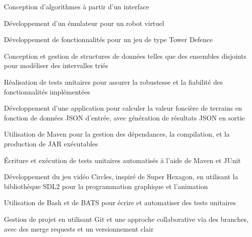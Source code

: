 \documentclass[letterpaper,10pt]{article}
\begin{document}
  \begin{resume_list}
    \item Conception d’algorithmes à partir d’un interface
    \vspace{2pt}
    \item Développement d’un émulateur pour un robot virtuel
    \vspace{2pt}
    \item Développement de fonctionnalités pour un jeu de type Tower Defence
    \vspace{2pt}
    \item Conception et gestion de structures de données telles que des ensembles disjoints pour modéliser des intervalles triés
    \vspace{2pt}
    \item Réalisation de tests unitaires pour assurer la robustesse et la fiabilité des fonctionnalités implémentées
    
  \end{resume_list}

  \begin{resume_list}
    \item Développement d’une application pour calculer la valeur foncière de terrains en fonction de données JSON d’entrée, avec génération de résultats JSON en sortie
    \vspace{2pt}
    \item Utilisation de Maven pour la gestion des dépendances, la compilation, et la production de JAR exécutables
    \vspace{2pt}
    \item Écriture et exécution de tests unitaires automatisés à l'aide de Maven et JUnit
  \end{resume_list}
  
  \begin{resume_list}
    \item Développement du jeu vidéo Circles, inspiré de Super Hexagon, en utilisant la bibliothèque SDL2 pour la programmation graphique et l’animation
    \vspace{2pt}
    \item Utilisation de Bash et de BATS pour écrire et automatiser des tests unitaires
    \vspace{2pt}
    \item Gestion de projet en utilisant Git et une approche collaborative via des branches, avec des merge requests et un versionnement clair
  \end{resume_list}
  
\end{document}
